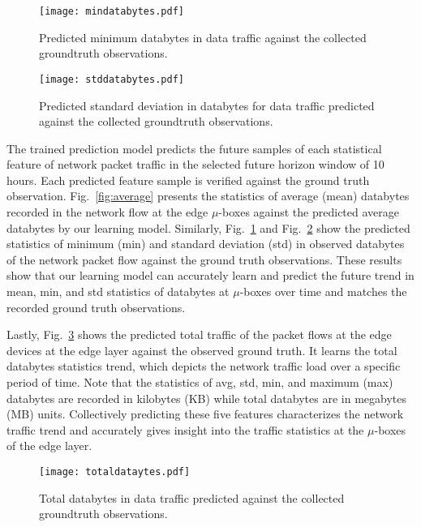\documentclass[10pt, conference]{IEEEtran}
\begin{document}
\begin{figure}
\centering
\texttt{[image: mindatabytes.pdf]}
\vspace{-7pt}
	\caption{Predicted minimum databytes in data traffic against the collected groundtruth observations.}
	\label{fig:minimum}
	\vspace{-10pt}
\end{figure}
\begin{figure}
\centering
\texttt{[image: stddatabytes.pdf]}
\vspace{-7pt}
	\caption{Predicted standard deviation in databytes for data traffic predicted against the collected groundtruth observations.}
	\label{fig:std}
	\vspace{-10pt}
\end{figure}

The trained prediction model predicts the future samples of each statistical feature of network packet traffic in the selected future horizon window of 10 hours. Each predicted feature sample is verified against the ground truth observation. 
Fig.~\ref{fig:average} presents the statistics of average (mean) databytes recorded in the network flow at the edge $\mu$-boxes against the predicted average databytes by our learning model. Similarly, Fig.~\ref{fig:minimum} and Fig.~\ref{fig:std} show the predicted statistics of minimum (min) and standard deviation (std) in observed databytes of the network packet flow against the ground truth observations. 
These results show that our learning model can accurately learn and predict the future trend in mean, min, and std statistics of databytes at $\mu$-boxes over time and matches the recorded ground truth observations. 

Lastly, Fig.~\ref{fig:total} shows the predicted total traffic of the packet flows at the edge devices at the edge layer against the observed ground truth. It learns the total databytes statistics trend, which depicts the network traffic load over a specific period of time. Note that the statistics of avg, std, min, and maximum (max) databytes are recorded in kilobytes (KB) while total databytes are in megabytes (MB) units. Collectively predicting these five features characterizes the network traffic trend and accurately gives insight into the traffic statistics at the $\mu$-boxes of the edge layer. 
\begin{figure}
\centering
\texttt{[image: totaldataytes.pdf]}
\vspace{-10pt}
	\caption{Total databytes in data traffic predicted against the collected groundtruth observations.}
	\label{fig:total}
	\vspace{-12pt}
\end{figure}
\end{document}

